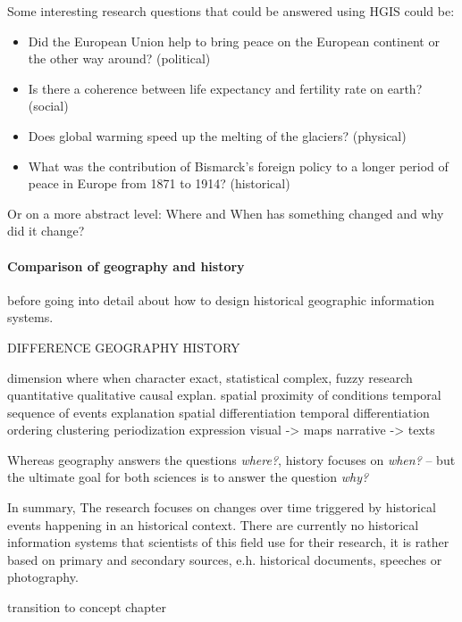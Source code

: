 Some interesting research questions that could be answered using HGIS could be:

\begin{itemize}
  \item Did the European Union help to bring peace on the European continent or the other way around? (political)
  \item Is there a coherence between life expectancy and fertility rate on earth? (social)
  \item Does global warming speed up the melting of the glaciers? (physical)
  \item What was the contribution of Bismarck's foreign policy to a longer period of peace in Europe from 1871 to 1914? (historical)
\end{itemize}

Or on a more abstract level: Where and When has something changed and why did it change?




\paragraph{Comparison of geography and history} %
\label{par:comparison_of_geography_and_history}

before going into detail about how to design historical geographic information systems.

DIFFERENCE        GEOGRAPHY                         HISTORY

dimension         where                             when
character         exact, statistical                complex, fuzzy
research          quantitative                      qualitative
causal explan.    spatial proximity of conditions   temporal sequence of events
explanation       spatial differentiation           temporal differentiation
ordering          clustering                        periodization
expression        visual -> maps                    narrative -> texts
\cite[pp. 2-4]{knowles2008placing}

Whereas geography answers the questions \emph{where?}, history focuses on \emph{when?} -- but the ultimate goal for both sciences is to answer the question \emph{why?}


In summary,  The research focuses on changes over time triggered by historical events happening in an historical context. There are currently no historical information systems that scientists of this field use for their research, it is rather based on primary and secondary sources, e.h. historical documents, speeches or photography.








\vspace{2em}
transition to concept chapter
